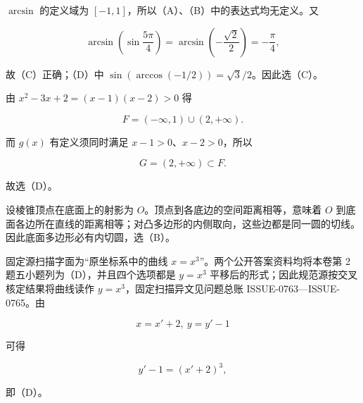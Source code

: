 \begin{answer}

$\arcsin$ 的定义域为 $[-1,1]$，所以（A）、（B）中的表达式均无定义。又

\nopagebreak[4]
\[
\arcsin\left(\sin\frac{5\pi}{4}\right)=\arcsin\left(-\frac{\sqrt2}{2}\right)=-\frac\pi4,
\]

故（C）正确；（D）中 $\sin(\arccos(-1/2))=\sqrt3/2$。因此选（C）。


由 $x^2-3x+2=(x-1)(x-2)>0$ 得

\nopagebreak[4]
\[
F=(-\infty,1)\cup(2,+\infty).
\]

而 $g(x)$ 有定义须同时满足 $x-1>0$、$x-2>0$，所以

\nopagebreak[4]
\[
G=(2,+\infty)\subset F.
\]

故选（D）。


设棱锥顶点在底面上的射影为 $O$。顶点到各底边的空间距离相等，意味着 $O$ 到底面各边所在直线的距离相等；对凸多边形的内侧取向，这些边都是同一圆的切线。因此底面多边形必有内切圆，选（B）。


固定源扫描字面为“原坐标系中的曲线 $x=x^3$”。两个公开答案资料均将本卷第 2 题五小题列为（D），并且四个选项都是 $y=x^3$ 平移后的形式；因此规范源按交叉核定结果将曲线读作 $y=x^3$，固定扫描异文见问题总账 ISSUE-0763—ISSUE-0765。由

\nopagebreak[4]
\[
x=x'+2,\ y=y'-1
\]

可得

\nopagebreak[4]
\[
y'-1=(x'+2)^3,
\]

即（D）。






\end{answer}
